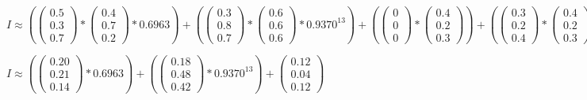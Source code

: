 $
    I
\approx
    \left(
        \left(\begin{array}{c}
            0.5\\
            0.3\\
            0.7
        \end{array}\right)
        *
        \left(\begin{array}{c}
            0.4\\
            0.7\\
            0.2
        \end{array}\right)
        *
        0.6963
    \right)
    +
    \left(
        \left(\begin{array}{c}
            0.3\\
            0.8\\
            0.7
        \end{array}\right)
        *
        \left(\begin{array}{c}
            0.6\\
            0.6\\
            0.6
        \end{array}\right)
        *
        0.9370^{13}
    \right)
    +
    \left(
        \left(\begin{array}{c}
            0\\
            0\\
            0
        \end{array}\right)
        *
        \left(\begin{array}{c}
            0.4\\
            0.2\\
            0.3
        \end{array}\right)
    \right)
    +
    \left(
        \left(\begin{array}{c}
            0.3\\
            0.2\\
            0.4
        \end{array}\right)
        *
        \left(\begin{array}{c}
            0.4\\
            0.2\\
            0.3
        \end{array}\right)
    \right)
$

$
    I
\approx
    \left(
        \left(\begin{array}{c}
            0.20\\
            0.21\\
            0.14
        \end{array}\right)
        *
        0.6963
    \right)
    +
    \left(
        \left(\begin{array}{c}
            0.18\\
            0.48\\
            0.42
        \end{array}\right)
        *
        0.9370^{13}
    \right)
    +
    \left(\begin{array}{c}
        0.12\\
        0.04\\
        0.12
    \end{array}\right)
$

